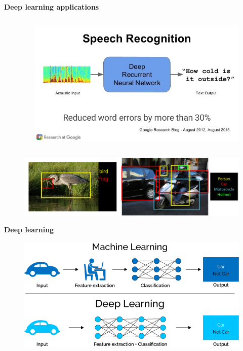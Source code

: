 \documentclass[xcolor=dvipsnames]{beamer}
\begin{document}
\begin{frame}{\bf Deep learning applications}
\begin{columns}
\begin{column}{0.33\textwidth}
    \end{column}


    \begin{column}{0.33\textwidth}  %

        \begin{figure}
        \includegraphics[scale=0.15]{../../pictures/speach_recognition.jpg}
        \end{figure}

    \end{column}

\end{columns}


\begin{figure}
\includegraphics[scale=0.2]{../../pictures/image_recognition.png}
\end{figure}

\end{frame}

\begin{frame}{\bf Deep learning \footnotemark}

  \begin{figure}
    \includegraphics[scale=0.4]{../../pictures/end_to_end_learning.png}
  \end{figure}


\end{frame}
\end{document}
